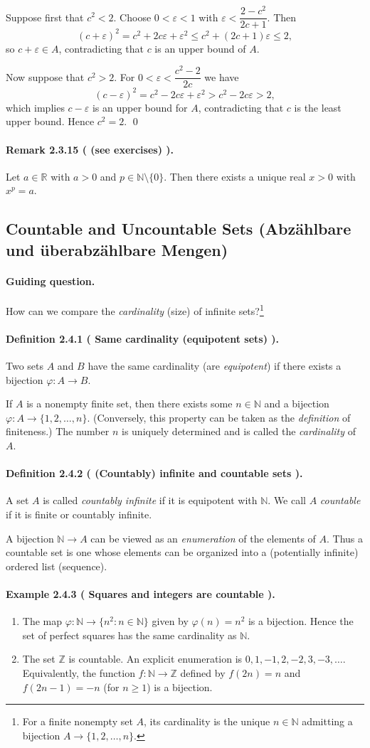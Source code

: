 \documentclass[12pt,a4paper]{article}
\newcommand{\N}{\mathbb{N}}
\newcommand{\Z}{\mathbb{Z}}
\newcommand{\R}{\mathbb{R}}
\newcommand{\eps}{\varepsilon}
\newcommand{\NumberedDefinition}[3]{%
\paragraph*{Definition #1 ( #2 ).} #3\par}
\newcommand{\NumberedExample}[3]{%
\paragraph*{Example #1 ( #2 ).} #3\par}
\newcommand{\NumberedRemark}[3]{%
\paragraph*{Remark #1 ( #2 ).} #3\par}
\theoremstyle{plain}
\theoremstyle{definition}
\theoremstyle{remark}
\begin{document}
Suppose first that $c^2<2$. Choose $0<\eps<1$ with $\eps<\dfrac{2-c^2}{2c+1}$. Then
\[
	(c+\eps)^2 = c^2 + 2c\eps + \eps^2 \le c^2 + (2c+1)\eps \le 2,
\]
so $c+\eps\in A$, contradicting that $c$ is an upper bound of $A$.

Now suppose that $c^2>2$. For $0<\eps<\dfrac{c^2-2}{2c}$ we have
\[
	(c-\eps)^2 = c^2 - 2c\eps + \eps^2 > c^2 - 2c\eps > 2,
\]
which implies $c-\eps$ is an upper bound for $A$, contradicting that $c$ is the least upper bound. Hence $c^2=2$. \qed

\NumberedRemark{2.3.15}{(see exercises)}{Let $a\in\R$ with $a>0$ and $p\in\N\setminus\{0\}$. Then there exists a unique real $x>0$ with $x^p=a$.}

\subsection{Countable and Uncountable Sets (Abzählbare und überabzählbare Mengen)}

\paragraph{Guiding question.} How can we compare the \emph{cardinality} (size) of infinite sets?\footnote{For a finite nonempty set $A$, its cardinality is the unique $n\in\N$ admitting a bijection $A\to\{1,2,\dots,n\}$.}

\NumberedDefinition{2.4.1}{Same cardinality (equipotent sets)}{Two sets $A$ and $B$ have the same cardinality (are \emph{equipotent}) if there exists a bijection $\varphi: A\to B$.}

If $A$ is a nonempty finite set, then there exists some $n\in\N$ and a bijection $\varphi: A\to\{1,2,\dots,n\}$. (Conversely, this property can be taken as the \emph{definition} of finiteness.) The number $n$ is uniquely determined and is called the \emph{cardinality} of $A$.

\NumberedDefinition{2.4.2}{(Countably) infinite and countable sets}{A set $A$ is called \emph{countably infinite} if it is equipotent with $\N$. We call $A$ \emph{countable} if it is finite or countably infinite.}

A bijection $\N\to A$ can be viewed as an \emph{enumeration} of the elements of $A$. Thus a countable set is one whose elements can be organized into a (potentially infinite) ordered list (sequence).

\NumberedExample{2.4.3}{Squares and integers are countable}{\begin{enumerate}[label={(\arabic*)}, leftmargin=*]
	\item The map $\varphi: \N\to \{ n^2 : n\in\N\}$ given by $\varphi(n)=n^2$ is a bijection. Hence the set of perfect squares has the same cardinality as $\N$.
	\item The set $\Z$ is countable. An explicit enumeration is $0,1,-1,2,-2,3,-3,\dots$. Equivalently, the function $f: \N\to\Z$ defined by $f(2n)=n$ and $f(2n-1)=-n$ (for $n\ge1$) is a bijection.
\end{enumerate}}
\end{document}
